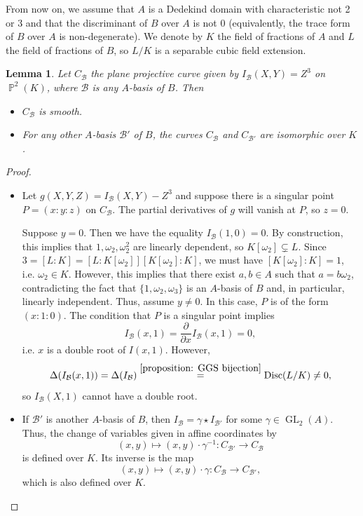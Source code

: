 \documentclass[oneside]{amsart}
\DeclareMathOperator{\disc}{Disc}
\DeclareMathOperator{\gl}{GL}
\DeclareMathOperator{\pp}{\mathbb{P}}
\newtheorem{lemma}[X]{Lemma}
\theoremstyle{definition}
\begin{document}
From now on, we assume that $A$ is a Dedekind domain with characteristic not 2 or 3 and that the discriminant of $B$ over $A$ is not 0 (equivalently, the trace form of $B$ over $A$ is non-degenerate). We denote by $K$ the field of fractions of $A$ and $L$ the field of fractions of $B$, so $L/K$ is a separable cubic field extension. 
\begin{lemma} Let $C_{\mathcal{B}}$ the plane projective curve given by  $I_{\mathcal{B}}(X,Y) = Z^3$ on $\pp^2(K)$, where $\mathcal{B}$ is any $A$-basis of $B$.  Then
\begin{itemize}
    \item[a)]  $C_{\mathcal{B}}$ is smooth. 
\item[b)] For any other $A$-basis $\mathcal{B}'$ of $B$, the curves $C_{\mathcal{B}}$ and $C_{\mathcal{B}'}$ are isomorphic over $K$.
\end{itemize}
\end{lemma}
\begin{proof}
  \begin{itemize}
      \item[a)]
    Let $g(X,Y,Z) = I_{\mathcal{B}}(X,Y) - Z^3$ and suppose there is a singular point $P = (x:y:z)$ on $C_{\mathcal{B}}$. The partial derivatives of $g$ will vanish at $P$, so $z = 0$. 
    
    Suppose $y = 0$. Then we have the equality $I_{\mathcal{B}}(1,0) = 0$. By construction, this implies that $1,\omega_2,\omega_2^2$ are linearly dependent, so $K[\omega_2] \subsetneq L$. Since $3 = [L:K] = [L:K[\omega_2]][K[\omega_2]:K]$, we must have $[K[\omega_2] : K] = 1$, i.e. $\omega_2 \in K$. However, this implies that there exist $a, b \in A$ such that $a = b\omega_2$, contradicting the fact that $\{1,\omega_2,\omega_3\}$ is an $A$-basis of $B$ and, in particular, linearly independent. Thus, assume $y \neq 0$. In this case, $P$ is of the form $(x:1:0)$. The condition that $P$ is a singular point implies 
    $$
    I_{\mathcal{B}}(x,1) = \frac{\partial}{\partial x} I_{\mathcal{B}}(x,1) = 0,
    $$
    i.e. $x$ is a double root of $I(x,1)$. However, 
    $$
    \Delta(I_{\mathcal{B}}(x,1)) = \Delta(I_{\mathcal{B}}) \overset{\ref{proposition: GGS bijection}}{=} \disc(L/K) \neq 0,
    $$ 
    so $I_{\mathcal{B}}(X,1)$ cannot have a double root.
    \item[b)] If $\mathcal{B}'$ is another $A$-basis of $B$, then $I_{\mathcal{B}} = \gamma\star I_{\mathcal{B}'}$ for some $\gamma \in \gl_2(A)$. Thus, the change of variables given in affine coordinates by 
    $$
    (x, y)\mapsto (x,y)\cdot\gamma^{-1}:C_{\mathcal{B}'} \to C_{\mathcal{B}}
    $$ 
    is defined over $K$. Its inverse is the map 
    $$
    (x, y)\mapsto (x,y)\cdot\gamma:C_{\mathcal{B}} \to C_{\mathcal{B}'},
    $$ 
    which is also defined over $K$. \qedhere
\end{itemize}
\end{proof}
\end{document}
